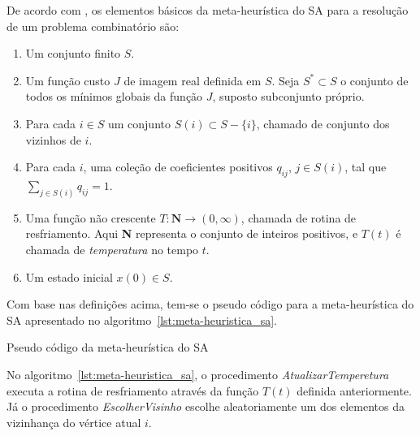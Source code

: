 De acordo com \cite{bertsimas1993simulated}, os elementos básicos da meta-heurística do SA
para a resolução de um problema combinatório são:

\begin{enumerate}
 \item Um conjunto finito $S$.
 \item Um função custo $J$ de imagem real definida em $S$. Seja $S^* \subset S$ o conjunto de todos os mínimos globais da
 função $J$, suposto subconjunto próprio.
 \item Para cada $i \in S$ um conjunto $S(i) \subset S - \{i\}$, chamado de conjunto dos vizinhos de $i$.
 \item Para cada $i$, uma coleção de coeficientes positivos $q_{ij}$, $j \in S(i)$, tal que $\sum_{j \in S(i)} q_{ij} = 1$.
 \item Uma função não crescente $T: \textbf{N} \rightarrow (0,\infty)$, chamada de rotina de resfriamento. Aqui \textbf{N}
 representa o conjunto de inteiros positivos, e $T(t)$ é chamada de \textit{temperatura} no tempo $t$.
 \item Um estado inicial $x(0) \in S$.
\end{enumerate}

Com base nas definições acima, tem-se o pseudo código para a meta-heurística do
SA apresentado no algoritmo~\ref{lst:meta-heuristica_sa}.

\begin{algorithm}[H]


\caption{Pseudo código da meta-heurística do SA}
\label{lst:meta-heuristica_sa}
\end{algorithm}

No algoritmo~\ref{lst:meta-heuristica_sa}, o procedimento \textit{AtualizarTemperetura} executa a
rotina de resfriamento através da função $T(t)$ definida anteriormente. Já o procedimento
\textit{EscolherVisinho} escolhe aleatoriamente um dos elementos da vizinhança do vértice atual $i$.
